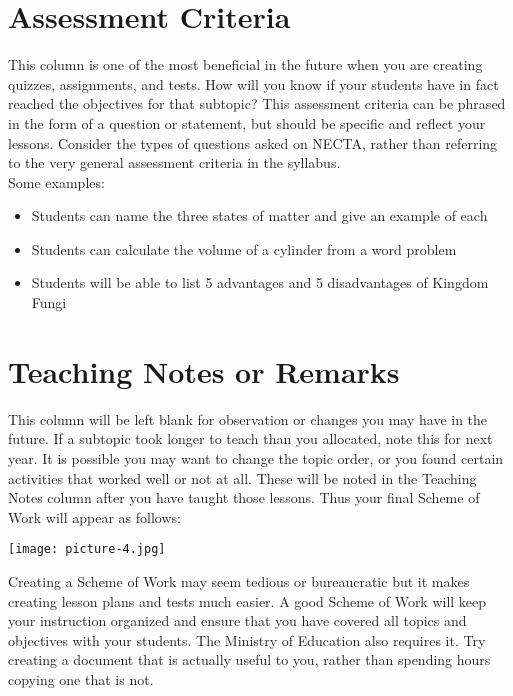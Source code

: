 \section{Assessment Criteria}
This column is one of the most beneficial in the future when you are creating quizzes, assignments, and tests.  How will you know if your students have in fact reached the objectives for that subtopic?  This assessment criteria can be phrased in the form of a question or statement, but should be specific and reflect your lessons.  Consider the types of questions asked on NECTA, rather than referring to the very general assessment criteria in the syllabus.\\
Some examples: 
\begin{itemize}
\item Students can name the three states of matter and give an example of each
\item Students can calculate the volume of a cylinder from a word problem
\item Students will be able to list 5 advantages and 5 disadvantages of Kingdom Fungi
\end{itemize}
  

\section{Teaching Notes or Remarks}
This column will be left blank for observation or changes you may have in the future.  If a subtopic took longer to teach than you allocated, note this for next year.  It is possible you may want to change the topic order, or you found certain activities that worked well or not at all.  These will be noted in the Teaching Notes column after you have taught those lessons.  
Thus your final Scheme of Work will appear as follows:

\begin{flushleft}
\texttt{[image: picture-4.jpg]} 
\end{flushleft}

Creating a Scheme of Work may seem tedious or bureaucratic but it makes creating lesson plans and tests much easier.  A good Scheme of Work will keep your instruction organized and ensure that you have covered all topics and objectives with your students.  The Ministry of Education also requires it.   Try creating a document that is actually useful to you, rather than spending hours copying one that is not.
